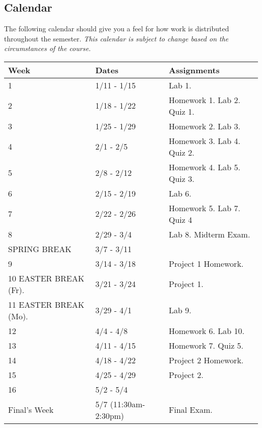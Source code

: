\documentclass[10pt]{article}
\begin{document}
\subsection{Calendar}

The following calendar should give you a feel for how work is distributed throughout the semester.  \textit{This calendar is subject to change based on the circumstances of the course.}

\begin{center}
\begin{tabular}{|l|l|l|}
\hline 
Week & Dates & Assignments \\
\hline
1 & 1/11 - 1/15 &  Lab 1.  \\
\hline
2 & 1/18 - 1/22 & Homework 1. Lab 2. Quiz 1. \\
\hline
3 & 1/25 - 1/29 & Homework 2. Lab 3.  \\
\hline
4 & 2/1 - 2/5 & Homework 3. Lab 4. Quiz 2.\\
\hline
5 & 2/8 - 2/12 & Homework 4. Lab 5. Quiz 3.  \\
\hline
6 & 2/15 - 2/19 & Lab 6. \\
\hline
7 & 2/22 - 2/26 & Homework 5. Lab 7.  Quiz 4  \\
\hline
8 & 2/29 - 3/4 & Lab 8. Midterm Exam. \\
\hline 
SPRING BREAK & 3/7 - 3/11 & \\
\hline
9 & 3/14 - 3/18 & Project 1 Homework.  \\
\hline
10 EASTER BREAK (Fr). & 3/21 - 3/24 & Project 1.  \\
\hline
11 EASTER BREAK (Mo). & 3/29 - 4/1 & Lab 9.  \\
\hline
12 & 4/4 - 4/8 & Homework 6. Lab 10.  \\
\hline
13 & 4/11 - 4/15 & Homework 7. Quiz 5.   \\
\hline
14 & 4/18 - 4/22 & Project 2 Homework.  \\
\hline
15 & 4/25 - 4/29 & Project 2.  \\ 
\hline
16 & 5/2 - 5/4 &   \\
\hline
Final's Week & 5/7 (11:30am-2:30pm) & Final Exam.   \\ 
\hline
\end{tabular}
\end{center}
\end{document}
